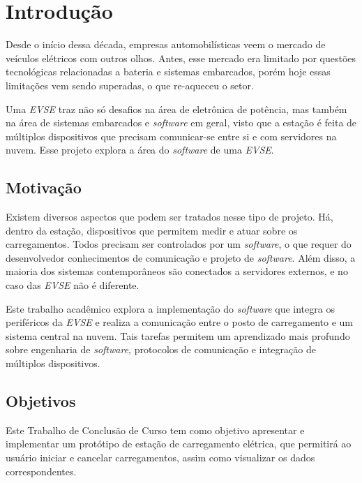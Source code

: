 \chapter{Introdução}
\label{stateofart:intro}

  Desde o início dessa década, empresas automobilísticas veem o mercado de veículos elétricos com outros olhos. Antes, esse mercado era limitado por questões tecnológicas relacionadas a bateria e sistemas embarcados, porém hoje essas limitações vem sendo superadas, o que re-aqueceu o setor.

  Uma \textit{\ac{EVSE}} traz não só desafios na área de eletrônica de potência, mas também na área de sistemas embarcados e \textit{software} em geral, visto que a estação é feita de múltiplos dispositivos que precisam comunicar-se entre si e com servidores na nuvem. Esse projeto explora a área do \textit{software} de uma \textit{\ac{EVSE}}.

  \section{Motivação}
  \label{stateofart:intro:motivation}

    Existem diversos aspectos que podem ser tratados nesse tipo de projeto. Há, dentro da estação, dispositivos que permitem medir e atuar sobre os carregamentos. Todos precisam ser controlados por um \textit{software}, o que requer do desenvolvedor conhecimentos de comunicação e projeto de \textit{software}. Além disso, a maioria dos sistemas contemporâneos são conectados a servidores externos, e no caso das \textit{\ac{EVSE}} não é diferente.

    Este trabalho acadêmico explora a implementação do \textit{software} que integra os periféricos da \textit{\ac{EVSE}} e realiza a comunicação entre o posto de carregamento e um sistema central na nuvem. Tais tarefas permitem um aprendizado mais profundo sobre engenharia de \textit{software}, protocolos de comunicação e integração de múltiplos dispositivos.

  \section{Objetivos}
  \label{stateofart:intro:objectives}

    Este Trabalho de Conclusão de Curso tem como objetivo apresentar e implementar um protótipo de estação de carregamento elétrica, que permitirá ao usuário iniciar e cancelar carregamentos, assim como visualizar os dados correspondentes.

